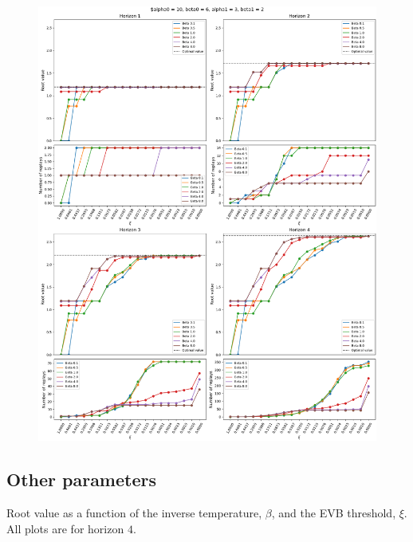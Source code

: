 \documentclass{article}
\begin{document}
\begin{figure}[ht!]
    \centering
    \includegraphics[width=1\textwidth]{../../../../bandit/data/convergence/xi/alpha010_beta06_alpha13_beta12_complete.png}
\end{figure}

\clearpage

\subsection*{Other parameters}

Root value as a function of the inverse temperature, $\beta$, and the EVB threshold, $\xi$. All plots are for horizon $4$.
\end{document}
